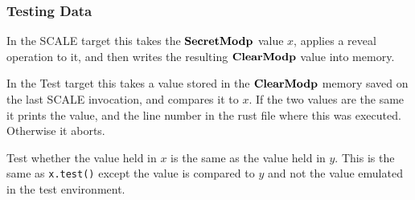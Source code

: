 \subsubsection{Testing Data}
In the SCALE target this takes the $\mathbf{SecretModp}$ value $x$,
applies a reveal operation to it, and then writes the
resulting $\mathbf{ClearModp}$ value into memory.

In the Test target this takes a value stored in the $\mathbf{ClearModp}$
memory saved on the last SCALE invocation, and compares it to
$x$. If the two values are the same it prints the value, and the
line number in the rust file where this was executed.
Otherwise it aborts.

Test whether the value held in $x$ is the same as the value held in $y$.
This is the same as \verb|x.test()| except the value is compared to
$y$ and not the value emulated in the test environment.
